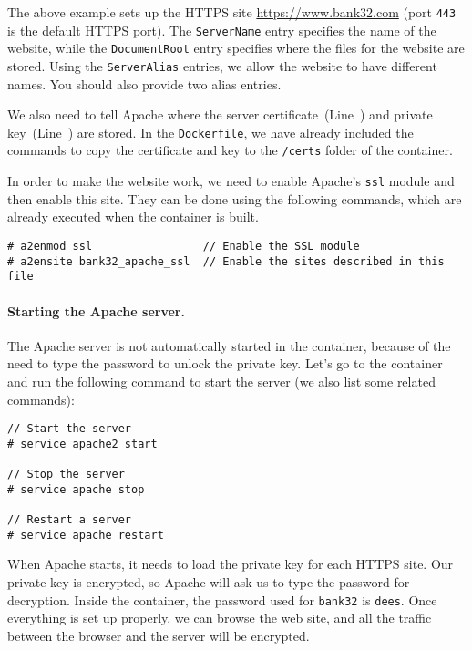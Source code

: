 The above example sets up the HTTPS site \url{https://www.bank32.com} (port \texttt{443} 
is the default HTTPS port). 
The \texttt{ServerName} entry specifies the name of the website, while
the \texttt{DocumentRoot} entry specifies where the files for 
the website are stored. Using the \texttt{ServerAlias} entries, we allow
the website to have different names. You should also provide two
alias entries. 

We also need to tell Apache where
the server certificate~(Line~) and private key~(Line~) are stored. 
In the \texttt{Dockerfile}, we have already included the commands to copy
the certificate and key to the \texttt{/certs} folder of the container.  


In order to make the website work, we need to enable Apache's \texttt{ssl} module and 
then enable this site. They can be done using the following commands, 
which are already executed when the container is built. 

\begin{lstlisting}
# a2enmod ssl                 // Enable the SSL module 
# a2ensite bank32_apache_ssl  // Enable the sites described in this file
\end{lstlisting}
 


\paragraph{Starting the Apache server.} The Apache server 
is not automatically started in the container, because of the 
need to type the password to unlock the private key. 
Let's go to the container and 
run the following command to start the server (we also list
some related commands): 

\begin{lstlisting}
// Start the server 
# service apache2 start

// Stop the server 
# service apache stop

// Restart a server 
# service apache restart
\end{lstlisting}


When Apache starts, it needs to load the private key for each HTTPS 
site. Our private key is encrypted, so Apache will ask us to type the password 
for decryption. Inside the container, the password used for \texttt{bank32}
is \texttt{dees}.  Once everything is set up properly, we can
browse the web site, and all the traffic between the browser and the server 
will be encrypted.


